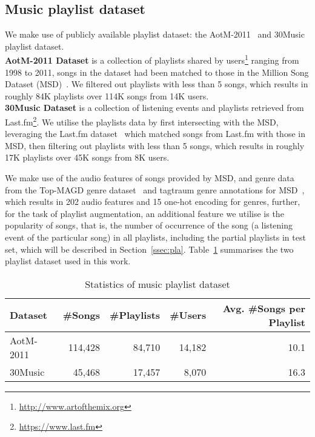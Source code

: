 \subsection{Music playlist dataset}
We make use of publicly available playlist dataset: the AotM-2011~\cite{mcfee2012hypergraph} and 30Music~\cite{30music2015} playlist dataset. \\
%
{\bf AotM-2011 Dataset} is a collection of playlists shared by users\footnote{\url{http://www.artofthemix.org}} ranging from 1998 to 2011, 
songs in the dataset had been matched to those in the Million Song Dataset (MSD)~\cite{msd2011}.
We filtered out playlists with less than 5 songs, which results in roughly 84K playlists over 114K songs from 14K users. \\
%
{\bf 30Music Dataset} is a collection of listening events and playlists retrieved from Last.fm\footnote{\url{https://www.last.fm}}.
We utilise the playlists data by first intersecting with the MSD, leveraging the Last.fm dataset~\cite{lastfmdataset} 
which matched songs from Last.fm with those in MSD, then filtering out playlists with less than 5 songs, 
which results in roughly 17K playlists over 45K songs from 8K users.

We make use of the audio features of songs provided by MSD, 
and genre data from the Top-MAGD genre dataset~\cite{schindler2012facilitating} and tagtraum genre annotations for MSD~\cite{schreiber2015improving},
which results in 202 audio features and 15 one-hot encoding for genres,
further, for the task of playlist augmentation, an additional feature we utilise is the popularity of songs,
that is, the number of occurrence of the song (\ie a listening event of the particular song) in all playlists,
including the partial playlists in test set, which will be described in Section~\ref{ssec:pla}.
%
%
Table~\ref{tab:stats_pldata} summarises the two playlist dataset used in this work.
%
\begin{table}[!h]
\centering
\caption{Statistics of music playlist dataset}
\label{tab:stats_pldata}
\small
\begin{tabular}{l|rrrr}
\toprule
Dataset   & \#Songs & \#Playlists & \#Users & Avg. \#Songs per Playlist \\
\midrule
AotM-2011 & 114,428 & 84,710      & 14,182  & 10.1 \\
30Music   & 45,468  & 17,457      & 8,070   & 16.3 \\
\bottomrule
\end{tabular}
\end{table}


